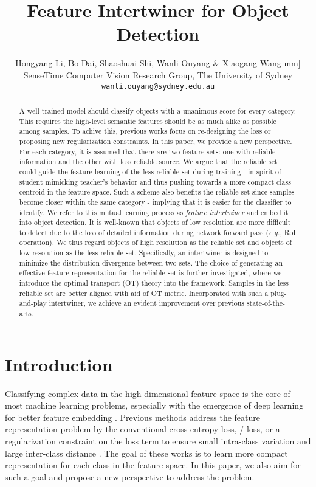 \documentclass{article} \usepackage{iclr2019_conference,times}
\title{Feature Intertwiner for Object Detection}
\author{Hongyang Li, Bo Dai, Shaoshuai Shi, Wanli Ouyang \& Xiaogang Wang
\1mm]
 SenseTime Computer Vision Research Group, The University of Sydney\\
\texttt{wanli.ouyang@sydney.edu.au}
}
\begin{document}
\maketitle

\begin{abstract}
	A well-trained model should classify objects with a unanimous score for every category. This requires the high-level semantic features should be as much alike as possible among samples.
To achive this, previous works focus on re-designing the loss or proposing new regularization constraints.
In this paper, we provide a new perspective.
For each category, it is assumed that there are two feature sets:
one with reliable information and the other with less reliable source.
We argue that the reliable set could guide the feature learning of the less reliable set during training - in spirit of student mimicking teacher's behavior and thus pushing towards a more compact class centroid in the feature space. 
Such a scheme also benefits the reliable set since samples become closer within the same category - implying that it is easier for the classifier to identify. 
We refer to this mutual learning process as \textit{feature intertwiner} and embed it into object detection.
It is well-known that objects of low resolution are more difficult to detect due to the loss of detailed information during network forward pass (\textit{e.g.}, RoI operation). We thus regard objects of high resolution as the reliable set and objects of low resolution as the less reliable set. 
Specifically, an intertwiner is designed to minimize the distribution divergence between two sets. 
The choice of generating an effective feature representation for the reliable set 
is further investigated, where  
we introduce the optimal transport (OT) theory into the framework. Samples in the less reliable set are better aligned with aid of OT metric. 
Incorporated with such a plug-and-play intertwiner, we achieve an evident improvement over previous state-of-the-arts.


\end{abstract}

\section{Introduction}\label{sec:introduction}

Classifying complex data in the high-dimensional feature space is the core of most machine learning problems, especially with the emergence of deep learning for better feature embedding \citep{krizhevsky12_alexnet,he2016_resnet,li2018_capsule,li2019_cmt,guo2018learning} . Previous methods address the feature representation problem by the conventional cross-entropy loss,  /  loss, or a regularization constraint on the loss term to ensure small intra-class variation and large inter-class distance \citep{janocha2017_loss,liu2017_coco_v2,wen2016_center_loss,liu2017_spherical_loss}. The goal of these works is to learn more compact representation for each class in the feature space. 
In this paper, we also aim for such a goal and propose a new perspective to address the problem. 
\end{document}
